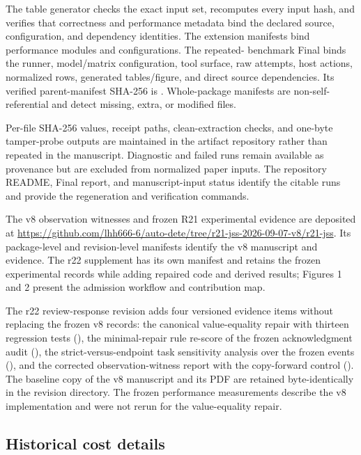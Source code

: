 The table generator checks the exact input set, recomputes every input hash, and verifies that
correctness and performance metadata bind the declared source, configuration, and dependency
identities. The extension manifests bind performance modules and configurations. The repeated-
benchmark Final binds the runner, model/matrix configuration, tool surface, raw attempts, host
actions, normalized rows, generated tables/figure, and direct source dependencies. Its verified
parent-manifest SHA-256 is
.
Whole-package manifests are non-self-referential and detect missing, extra, or modified files.

Per-file SHA-256 values, receipt paths, clean-extraction checks, and one-byte tamper-probe outputs
are maintained in the artifact repository rather than repeated in the manuscript. Diagnostic and
failed runs remain available as provenance but are excluded from normalized paper inputs. The
repository README, Final report, and manuscript-input status identify the citable runs and provide
the regeneration and verification commands.

The v8 observation witnesses and frozen R21 experimental evidence are deposited at \url{https://github.com/lhh666-6/auto-dete/tree/r21-jss-2026-09-07-v8/r21-jss}. Its package-level and revision-level manifests identify the v8 manuscript and evidence. The r22 supplement has its own manifest and retains the frozen experimental records while adding repaired code and derived results; Figures 1 and 2 present the admission workflow and contribution map.

The r22 review-response revision adds four versioned evidence items without replacing the frozen v8 records: the canonical value-equality repair with thirteen regression tests (), the minimal-repair rule re-score of the frozen acknowledgment audit (), the strict-versus-endpoint task sensitivity analysis over the frozen events (), and the corrected observation-witness report with the copy-forward control (). The baseline copy of the v8 manuscript and its PDF are retained byte-identically in the revision directory. The frozen performance measurements describe the v8 implementation and were not rerun for the value-equality repair.


\subsection{Historical cost details}
\label{app:historical-cost}

